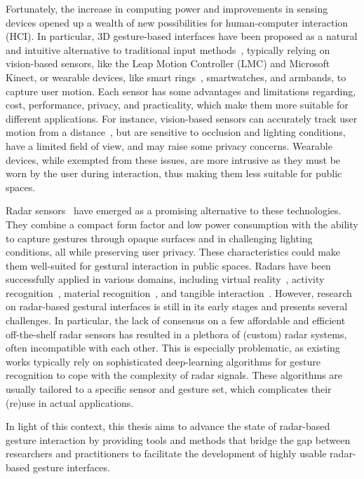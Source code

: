 Fortunately, the increase in computing power and improvements in sensing devices opened up a wealth of new possibilities for human-computer interaction (HCI). 
In particular, 3D gesture-based interfaces have been proposed as a natural and intuitive alternative to traditional input methods~\cite{Vatavu:2014b,Huang:2019}, typically relying on vision-based sensors, like the Leap Motion Controller (LMC) and Microsoft Kinect, or wearable devices, like smart rings~\cite{Gheran:2018}, smartwatches, and armbands, to capture user motion.
% 
Each sensor has some advantages and limitations regarding, \eg cost, performance, privacy, and practicality, which make them more suitable for different applications. 
%
For instance, vision-based sensors can accurately track user motion from a distance~\cite{Weichert:2013,DeSmedt:2017}, but are sensitive to occlusion and lighting conditions, have a limited field of view, and may raise some privacy concerns.  
%
Wearable devices, while exempted from these issues, are more intrusive as they must be worn by the user during interaction, thus making them less suitable for public spaces.

Radar sensors~\cite{Yeo:2016} have emerged as a promising alternative to these technologies. They combine a compact form factor and low power consumption with the ability to capture gestures through opaque surfaces and in challenging lighting conditions, all while preserving user privacy. These characteristics could make them well-suited for gestural interaction in public spaces.
%
Radars have been successfully applied in various domains, including virtual reality~\cite{Huesser:2021}, activity recognition~\cite{Avrahami:2018,Avrahami:2020}, material recognition~\cite{Flintoff:2018, Yeo:2016}, and tangible interaction~\cite{Yeo:2019}. 
%
However, research on radar-based gestural interfaces is still in its early stages and presents several challenges.
%
In particular, the lack of consensus on a few affordable and efficient off-the-shelf radar sensors has resulted in a plethora of (custom) radar systems, often incompatible with each other.
%
This is especially problematic, as existing works typically rely on sophisticated deep-learning algorithms for gesture recognition to cope with the complexity of radar signals. These algorithms are usually tailored to a specific sensor and gesture set, which complicates their (re)use in actual applications.

In light of this context, this thesis aims to advance the state of radar-based gesture interaction by providing tools and methods that bridge the gap between researchers and practitioners to facilitate the development of highly usable radar-based gesture interfaces.



